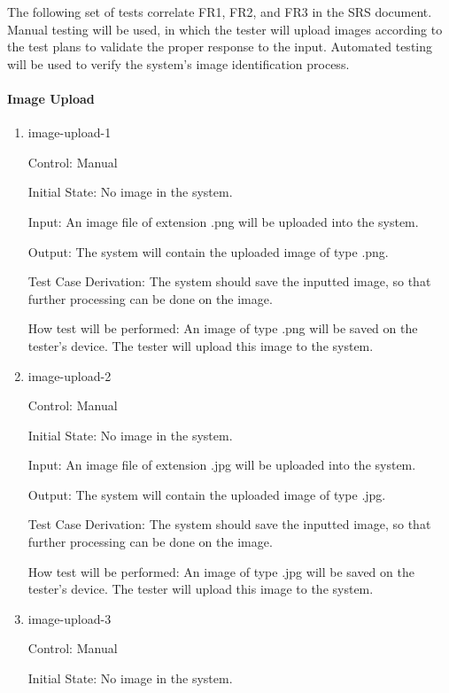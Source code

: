 \documentclass[12pt, titlepage]{article}
\begin{document}
The following set of tests correlate FR1, FR2, and FR3 in the SRS document. Manual testing will be used, in which the tester will upload images according to the test plans to validate the proper response to the input. Automated testing will be used to verify the system's image identification process.
		
\paragraph{Image Upload}

\begin{enumerate}

\item{image-upload-1\\}

Control: Manual
					
Initial State: No image in the system.
					
Input: An image file of extension .png will be uploaded into the system.
					
Output: The system will contain the uploaded image of type .png.

Test Case Derivation: The system should save the inputted image, so that further processing can be done on the image.
					
How test will be performed: An image of type .png will be saved on the tester's device. The tester will upload this image to the system.
					
\item{image-upload-2\\}

Control: Manual

Initial State: No image in the system.

Input: An image file of extension .jpg will be uploaded into the system.

Output: The system will contain the uploaded image of type .jpg.

Test Case Derivation: The system should save the inputted image, so that further processing can be done on the image.

How test will be performed: An image of type .jpg will be saved on the tester's device. The tester will upload this image to the system.

\item{image-upload-3\\}

Control: Manual

Initial State: No image in the system.


\end{enumerate}
\end{document}
